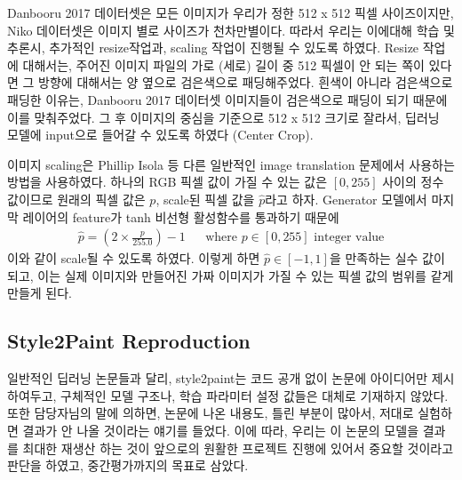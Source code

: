 Danbooru 2017 데이터셋은 모든 이미지가 우리가 정한 512 x 512 픽셀 사이즈이지만, Niko 데이터셋은 이미지 별로 사이즈가 천차만별이다.
따라서 우리는 이에대해 학습 및 추론시, 추가적인 resize작업과, scaling 작업이 진행될 수 있도록 하였다.
Resize 작업에 대해서는, 주어진 이미지 파일의 가로 (세로) 길이 중 512 픽셀이 안 되는 쪽이 있다면 그 방향에 대해서는 양 옆으로 검은색으로 패딩해주었다.
흰색이 아니라 검은색으로 패딩한 이유는, Danbooru 2017 데이터셋 이미지들이 검은색으로 패딩이 되기 때문에 이를 맞춰주었다.
그 후 이미지의 중심을 기준으로 512 x 512 크기로 잘라서, 딥러닝 모델에 input으로 들어갈 수 있도록 하였다 (Center Crop).

이미지 scaling은 Phillip Isola \cite{phillip2017}등 다른 일반적인 image translation 문제에서 사용하는 방법을 사용하였다. 하나의 RGB 픽셀 값이 가질 수 있는 값은 $[0, 255]$ 사이의 정수 값이므로 원래의 픽셀 값은 $p$, scale된 픽셀 값을 $\hat{p}$라고 하자. Generator 모델에서 마지막 레이어의 feature가 tanh 비선형 활성함수를 통과하기 때문에
\begin{align}
	\hat{p} = (2 \times \frac{p}{255.0}) - 1 && \text{where $p \in [0, 255]$ integer value}
\end{align}
이와 같이 scale될 수 있도록 하였다. 이렇게 하면 $\hat{p} \in [-1, 1]$을 만족하는 실수 값이 되고, 이는 실제 이미지와 만들어진 가짜 이미지가 가질 수 있는 픽셀 값의 범위를 같게 만들게 된다.

\subsection{Style2Paint Reproduction}

일반적인 딥러닝 논문들과 달리, style2paint는 코드 공개 없이 논문에 아이디어만 제시하여두고, 구체적인 모델 구조나, 학습 파라미터 설정 값들은 대체로 기재하지 않았다.
또한 담당자님의 말에 의하면, 논문에 나온 내용도, 틀린 부분이 많아서, 저대로 실험하면 결과가 안 나올 것이라는 얘기를 들었다. 
이에 따라, 우리는 이 논문의 모델을 결과를 최대한 재생산 하는 것이 앞으로의 원활한 프로젝트 진행에 있어서 중요할 것이라고 판단을 하였고, 중간평가까지의 목표로 삼았다.